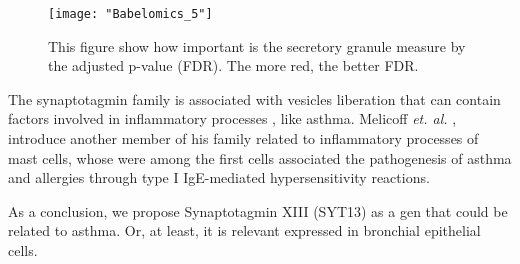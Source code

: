\documentclass[conference,a4paper]{IEEEtran}
\begin{document}
\begin{figure}
\centering
\texttt{[image: "Babelomics\_5"]}
\caption{This figure show how important is the secretory granule measure by the adjusted p-value (FDR). The more red, the better FDR.}
\label{fig:Babelomics}
\end{figure}

The synaptotagmin family is associated with vesicles liberation that can contain factors involved in inflammatory processes \cite{synaptotagmin}, like asthma. Melicoff \emph{et. al.} \cite{melicoff2009}, introduce another member of his family related to inflammatory processes of mast cells, whose were among the first cells associated the pathogenesis of asthma and allergies through type I IgE-mediated hypersensitivity reactions.

As a conclusion, we propose Synaptotagmin XIII (SYT13) as a gen that could be related to asthma. Or, at least, it is relevant expressed in bronchial epithelial cells. 
\end{document}
